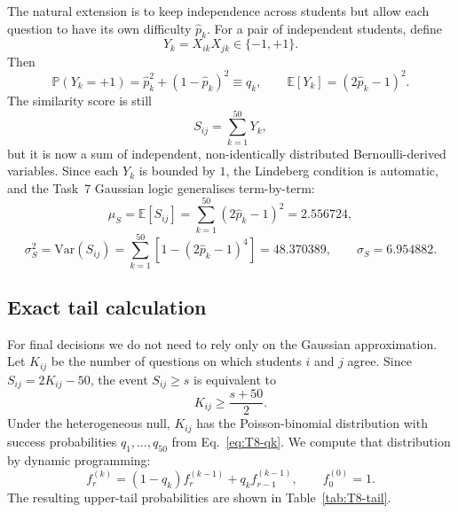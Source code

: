 \documentclass[11pt,a4paper]{article}
\newcommand{\Exp}{\mathbb{E}}
\newcommand{\Var}{\mathrm{Var}}
\renewcommand{\Pr}{\mathbb{P}}
\begin{document}
The natural extension is to keep independence across students but allow
each question to have its own difficulty $\hat p_k$. For a pair of
independent students, define
\[
  Y_k = X_{ik}X_{jk}\in\{-1,+1\}.
\]
Then
\begin{equation}
  \Pr(Y_k=+1)
  = \hat p_k^2 + (1-\hat p_k)^2
  \equiv q_k,
  \qquad
  \Exp[Y_k]=(2\hat p_k-1)^2.
  \label{eq:T8-qk}
\end{equation}
The similarity score is still
\[
  S_{ij}=\sum_{k=1}^{50}Y_k,
\]
but it is now a sum of independent, non-identically distributed
Bernoulli-derived variables. Since each $Y_k$ is bounded by $1$, the
Lindeberg condition is automatic, and the Task~7 Gaussian logic
generalises term-by-term:
\begin{equation}
  \mu_S = \Exp[S_{ij}]
  = \sum_{k=1}^{50}(2\hat p_k-1)^2
  = 2.556724,
  \label{eq:T8-mu}
\end{equation}
\begin{equation}
  \sigma_S^2 = \Var(S_{ij})
  = \sum_{k=1}^{50}\left[1-(2\hat p_k-1)^4\right]
  = 48.370389,
  \qquad
  \sigma_S = 6.954882.
  \label{eq:T8-sigma}
\end{equation}

\subsection{Exact tail calculation}
For final decisions we do not need to rely only on the Gaussian
approximation. Let $K_{ij}$ be the number of questions on which students
$i$ and $j$ agree. Since $S_{ij}=2K_{ij}-50$, the event
$S_{ij}\geq s$ is equivalent to
\[
  K_{ij}\geq \frac{s+50}{2}.
\]
Under the heterogeneous null,
$K_{ij}$ has the Poisson-binomial distribution with success
probabilities $q_1,\ldots,q_{50}$ from Eq.~\eqref{eq:T8-qk}. We compute
that distribution by dynamic programming:
\[
  f_{r}^{(k)}
  =
  (1-q_k)f_{r}^{(k-1)} + q_k f_{r-1}^{(k-1)},
  \qquad
  f_0^{(0)}=1.
\]
The resulting upper-tail probabilities are shown in
Table~\ref{tab:T8-tail}.
\end{document}
